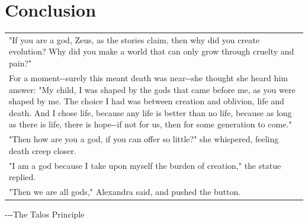 \documentclass[12pt]{cmuthesis}
\begin{document}
\newtheorem{lemma}{Lemma}
\newtheorem{theorem}{Theorem}
\newtheorem{definition}{Definition}

\newcommand\llama[1]{\texttt{[image: llama.pdf]}}
\newcommand\llitem{\item[\raisebox{-0.15em}{\llama{1.2em}}]}

\newcommand{\inspirationallinebreak}{\vspace{0.25em}}
\newcommand{\inspirationalhyphen}{-\hspace{-0.15em}-\xspace}
\newcommand\inspirationalquote[2]{\begin{flushright}
	\vspace{-1em}
	{
	\fontspec[Path=./fonts/]{AlexaStd}
	{\em #1}
	\inspirationallinebreak

	-\hspace{-0.15em}-\hspace{-0.15em}-{#2}
	}
	\vspace{2em}
\end{flushright}}










\chapter{Conclusion}
\label{chap:conclusion}
%
\inspirationalquote{
	\begin{tabular}{p{}}
	"If you are a god, Zeus, as the stories claim, then why did you create evolution?
	Why did you make a world that can only grow through cruelty and pain?"
	\\
	For a moment\inspirationalhyphen{}surely this meant death was near\inspirationalhyphen{}she thought she heard him answer:
	"My child, I was shaped by the gods that came before me, as you were shaped by me.
	The choice I had was between creation and oblivion, life and death.
	And I chose life, because any life is better than no life,
	because as long as there is life, there is hope\inspirationalhyphen{}if not for us, then for some generation to come."
	\\
	"Then how are you a god, if you can offer so little?" she whispered, feeling death creep closer.
	\\
	"I am a god because I take upon myself the burden of creation," the statue replied.
	\\
	"Then we are all gods," Alexandra said, and pushed the button.
	\end{tabular}}
{The Talos Principle}
\end{document}
